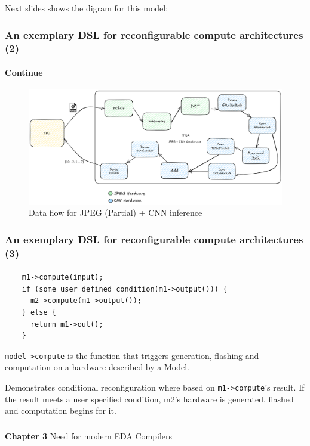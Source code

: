 \documentclass{beamer}
\begin{document}
{\begin{frame}[fragile]
  Next slides shows the digram for this model:

\end{frame}

\begin{frame}[fragile]
  \frametitle{An exemplary DSL for reconfigurable compute architectures (2)}
\framesubtitle{Continue}
   \begin{figure}
        \centering
        \includegraphics[width=1\linewidth]{flowcnnjpeg.png}
        \caption{Data flow for JPEG (Partial) + CNN inference}
    \end{figure}
\end{frame}

\begin{frame}[fragile]
  \frametitle{An exemplary DSL for reconfigurable compute architectures (3)}
\framesubtitle{}
  \begin{verbatim}
    m1->compute(input);
    if (some_user_defined_condition(m1->output())) {
      m2->compute(m1->output());
    } else {
      return m1->out();
    }
\end{verbatim}
  \texttt{model->compute} is the function that triggers generation, flashing and
  computation on a hardware described by a Model.

  Demonstrates conditional reconfiguration where based on \texttt{m1->compute}'s
  result. If the result meets a user specified condition, m2's hardware is
  generated, flashed and computation begins for it.
\end{frame}

\begin{frame}[c,fragile]
  \frametitle{}

  \centering
  \textbf{Chapter 3} 
  \centering
  Need for modern EDA Compilers
\end{frame}

\newcommand\myheading[1]{%
  \par\bigskip
  {\Large\bfseries#1}\par\smallskip}

}
\end{document}
